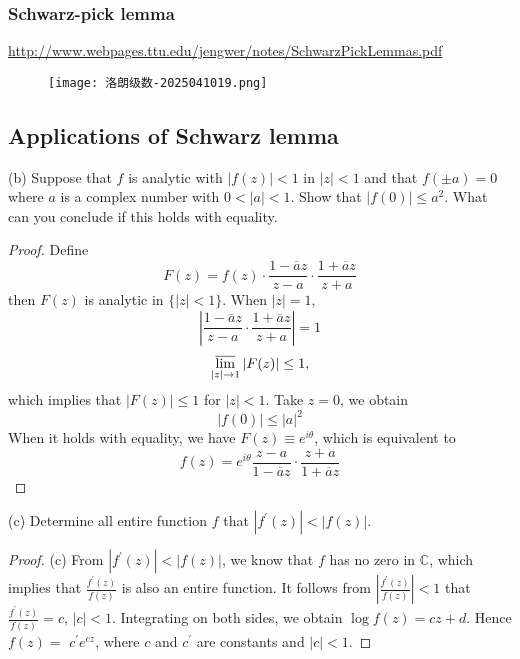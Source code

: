 \subsubsection{Schwarz-pick lemma}

\href{http://www.webpages.ttu.edu/jengwer/notes/SchwarzPickLemmas.pdf}{http://www.webpages.ttu.edu/jengwer/notes/SchwarzPickLemmas.pdf}

\begin{figure}[H]
\centering
\texttt{[image: 洛朗级数-2025041019.png]}
\label{}
\end{figure}

\subsection{Applications of Schwarz lemma}

\begin{exercise}
(b) Suppose that $f$ is analytic with $|f(z)|<1$ in $|z|<1$ and that $f( \pm a)=0$ where $a$ is a complex number with $0<|a|<1$. Show that $|f(0)| \leq a^2$. What can you conclude if this holds with equality.
\end{exercise}
\begin{proof}
Define
\[
F(z)=f(z) \cdot \frac{1-\overline{a} z}{z-a} \cdot \frac{1+\overline{a} z}{z+a}
\]
then $F(z)$ is analytic in $\{|z|<1\}$. When $|z|=1$,
\[
\left|\frac{1-\overline{a} z}{z-a} \cdot \frac{1+\overline{a} z}{z+a}\right|=1
\]
\[
\varlimsup_{|z| \rightarrow 1}|F(z)| \leq 1,
\]
which implies that $|F(z)| \leq 1$ for $|z|<1$. Take $z=0$, we obtain
\[
|f(0)| \leq|a|^2
\]
When it holds with equality, we have $F(z) \equiv e^{i \theta}$, which is equivalent to
\[
f(z)=e^{i \theta} \frac{z-a}{1-\overline{a} z} \cdot \frac{z+a}{1+\overline{a} z}
\]
\end{proof}

\begin{exercise}[Stanford]
(c) Determine all entire function $f$ that $\left|f^{\prime}(z)\right|<|f(z)|$.
\end{exercise}
\begin{proof}
(c) From $\left|f^{\prime}(z)\right|<|f(z)|$, we know that $f$ has no zero in $\mathbb{C}$, which implies that $\frac{f^{\prime}(z)}{f(z)}$ is also an entire function. It follows from $\left|\frac{f^{\prime}(z)}{f(z)}\right|<1$ that $\frac{f^{\prime}(z)}{f(z)}=c$, $|c|<1$. Integrating on both sides, we obtain $\log f(z)=c z+d$. Hence $f(z)=$ $c^{\prime} e^{c z}$, where $c$ and $c^{\prime}$ are constants and $|c|<1$.
\end{proof}
